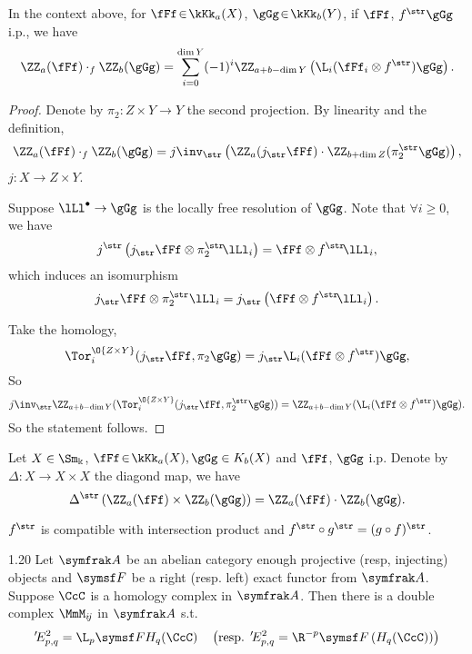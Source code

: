 \begin{proposition}{}{}
	In the context above, for $\fFf \!\in\!\kKk_a(X)$, $\gGg\!\in\!\kKk_b(Y)$, if $\fFf$, $f^{\str} \gGg$ i.p., we have
	$$
	\ZZ_a(\fFf)\cdot_f\ZZ_b(\gGg)=\sum_{i=0}^{\dim Y}(-1)^i \ZZ_{a+b-\dim Y}\left(\L_i(\fFf_i\otimes f^{\str}) \gGg\right).
	$$
\end{proposition}

\begin{proof}
	Denote by $\pi_2: Z \times Y \rightarrow Y$ the second projection. By linearity and the definition,
	\[
			\ZZ_a(\fFf)\cdot_f\ZZ_b(\gGg)=j\inv_{\str}\left(\ZZ_a(j_{\str}\fFf)\cdot\ZZ_{b+\dim Z}(\pi_2^{\str}\gGg)\right),
	\]
	$j\colon X\to Z\times Y$.

	Suppose $\lLl^{\bullet} \rightarrow \gGg$ is the locally free resolution of $\gGg$. Note
	that $\forall i \geqslant 0$, we have $$ j^{\str}\left(j_{\str} \fFf \otimes
	{\pi_2^{\str}}\! \lLl_i\right)=\fFf \otimes {f^{\str}}\! \lLl_i, $$ which induces an
	isomurphism $$j_{\str} \fFf \otimes \pi_2^{\str} \lLl_i=j_{\str}\left(\fFf \otimes
	f^{\str}\! \lLl_i\right).$$

	Take the homology,
	\[
			\Tor_i^{\O{Z\times Y}}(j_{\str}\fFf,\pi_2\gGg)=j_{\str}\L_i(\fFf\otimes f^{\str})\gGg,
	\]
	So
	\[
			j\inv_{\str}\ZZ_{a+b-\dim Y}(\Tor_i^{\O{Z\times Y}}(j_{\str}\fFf,\pi_2^{\str}\gGg))=\ZZ_{a+b-\dim Y}(\L_i(\fFf\otimes f^{\str})\gGg).
	\]
	So the statement follows.
\end{proof}

\begin{proposition}{}{}
	Let $X \in \Sm_{\Bbbk}$, $\fFf \!\in\!\kKk_a(X), \gGg \in K_b(X)$ and $\fFf$, $\gGg$ i.p. Denote by $\Delta\colon X \rightarrow X \times X$ the diagond map, we have
	$$
	\Delta^{\str}\left(\ZZ_a(\fFf) \times \ZZ_b(\gGg)\right)=\ZZ_a(\fFf) \cdot \ZZ_b(\gGg).
	$$
\end{proposition}

\begin{proposition}{}{}
	$f^{\str}$ is compatible with intersection product and $f^{\str}\circ g^{\str}=(g \circ f)^{\str}$.
\end{proposition}
\begin{lemma}{}{1.20}
	Let $\symfrak A$ be an abelian category enough projective (resp, injecting) objects and $\symsf F$ be a right (resp. left) exact functor from $\symfrak A$. Suppose $\CcC$ is a homology complex in $\symfrak A$. Then there is a double complex $\MmM_{i\!j}$ in $\symfrak A$ s.t.
	$$
	'\!E_{p, q}^2=\L_p\symsf F H_q(\CcC) \quad\left(\text{resp. }'\!E_{p, q}^2=\R^{-p}\symsf F\left(H_q(\CcC)\right)\right)
	$$
\end{lemma}

